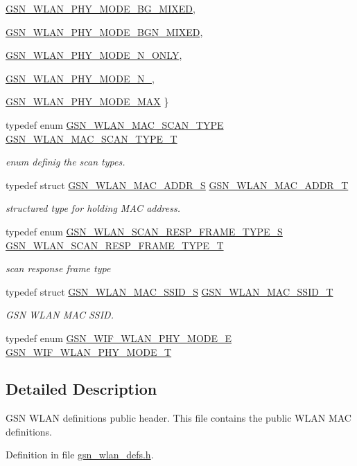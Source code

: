 \begin{DoxyCompactItemize}
\par
\hyperlink{a00641_ga9150700f5a8033a0c34dba0d69e2ff38ae6b5f2dd183f21b571117e253f8d3a5f}{GSN\_\-WLAN\_\-PHY\_\-MODE\_\-BG\_\-MIXED}, 
\par
\hyperlink{a00641_ga9150700f5a8033a0c34dba0d69e2ff38a7d1e257501850ebbe688e222ae2ffcb0}{GSN\_\-WLAN\_\-PHY\_\-MODE\_\-BGN\_\-MIXED}, 
\par
\hyperlink{a00641_ga9150700f5a8033a0c34dba0d69e2ff38a62ad918b30aad8dec0a843c4776e568f}{GSN\_\-WLAN\_\-PHY\_\-MODE\_\-N\_\-ONLY}, 
\par
\hyperlink{a00641_ga9150700f5a8033a0c34dba0d69e2ff38a6b517b7ed73031d71230816e95cbdf5c}{GSN\_\-WLAN\_\-PHY\_\-MODE\_\-N\_}, 
\par
\hyperlink{a00641_ga9150700f5a8033a0c34dba0d69e2ff38a350412525ef42f390e738696528ab4ed}{GSN\_\-WLAN\_\-PHY\_\-MODE\_\-MAX}
 \}
\item 
typedef enum \hyperlink{a00641_ga52dec04a012aa9893ac84e96062c470b}{GSN\_\-WLAN\_\-MAC\_\-SCAN\_\-TYPE} \hyperlink{a00641_gab674354b3ef30f1389f12adc7d3e887e}{GSN\_\-WLAN\_\-MAC\_\-SCAN\_\-TYPE\_\-T}
\begin{DoxyCompactList}\small\item\em enum definig the scan types. \end{DoxyCompactList}\item 
typedef struct \hyperlink{a00416}{GSN\_\-WLAN\_\-MAC\_\-ADDR\_\-S} \hyperlink{a00641_gabf7f5cc6656c9288e5d56c8aeafc8477}{GSN\_\-WLAN\_\-MAC\_\-ADDR\_\-T}
\begin{DoxyCompactList}\small\item\em structured type for holding MAC address. \end{DoxyCompactList}\item 
typedef enum \hyperlink{a00641_ga3f0acfab3987e81164e864f7186c7187}{GSN\_\-WLAN\_\-SCAN\_\-RESP\_\-FRAME\_\-TYPE\_\-S} \hyperlink{a00641_gaa94bed1d5a9ada3dfd819b8719bf6d55}{GSN\_\-WLAN\_\-SCAN\_\-RESP\_\-FRAME\_\-TYPE\_\-T}
\begin{DoxyCompactList}\small\item\em scan response frame type \end{DoxyCompactList}\item 
typedef struct \hyperlink{a00417}{GSN\_\-WLAN\_\-MAC\_\-SSID\_\-S} \hyperlink{a00641_gab5c477ba63fc3009f84b8dfc5efb6b81}{GSN\_\-WLAN\_\-MAC\_\-SSID\_\-T}
\begin{DoxyCompactList}\small\item\em GSN WLAN MAC SSID. \end{DoxyCompactList}\item 
typedef enum \hyperlink{a00641_ga9150700f5a8033a0c34dba0d69e2ff38}{GSN\_\-WIF\_\-WLAN\_\-PHY\_\-MODE\_\-E} \hyperlink{a00641_ga9f600b5e4ee36d4315abb0cd1e0b1a78}{GSN\_\-WIF\_\-WLAN\_\-PHY\_\-MODE\_\-T}
\end{DoxyCompactItemize}


\subsection{Detailed Description}
GSN WLAN definitions public header. This file contains the public WLAN MAC definitions. 

Definition in file \hyperlink{a00614_source}{gsn\_\-wlan\_\-defs.h}.

